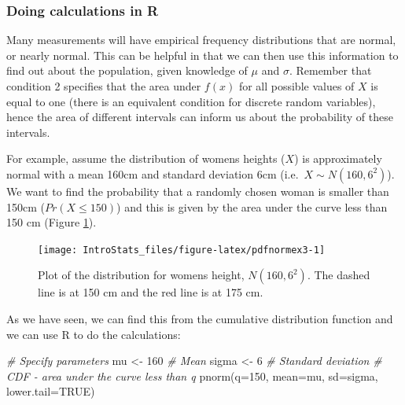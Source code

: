 \documentclass[
  oneside]{krantz}
\newenvironment{Shaded}{\begin{snugshade}}{\end{snugshade}}
\newcommand{\AttributeTok}[1]{\textcolor[rgb]{0.77,0.63,0.00}{#1}}
\newcommand{\CommentTok}[1]{\textcolor[rgb]{0.56,0.35,0.01}{\textit{#1}}}
\newcommand{\ConstantTok}[1]{\textcolor[rgb]{0.00,0.00,0.00}{#1}}
\newcommand{\DecValTok}[1]{\textcolor[rgb]{0.00,0.00,0.81}{#1}}
\newcommand{\FunctionTok}[1]{\textcolor[rgb]{0.00,0.00,0.00}{#1}}
\newcommand{\NormalTok}[1]{#1}
\newcommand{\OtherTok}[1]{\textcolor[rgb]{0.56,0.35,0.01}{#1}}
\begin{document}
\hypertarget{doing-calculations-in-r}{%
\subsubsection{Doing calculations in R}\label{doing-calculations-in-r}}

Many measurements will have empirical frequency distributions that are normal, or nearly normal. This can be helpful in that we can then use this information to find out about the population, given knowledge of \(\mu\) and \(\sigma\). Remember that condition 2 specifies that the area under \(f(x)\) for all possible values of \(X\) is equal to one (there is an equivalent condition for discrete random variables), hence the area of different intervals can inform us about the probability of these intervals.

For example, assume the distribution of womens heights (\(X\)) is approximately normal with a mean 160cm and standard deviation 6cm (i.e.~\(X \sim N(160, 6^2)\)). We want to find the probability that a randomly chosen woman is smaller than 150cm (\(Pr(X \le 150)\)) and this is given by the area under the curve less than 150 cm (Figure \ref{fig:pdfnormex3}).



\begin{figure}

{\centering \texttt{[image: IntroStats\_files/figure-latex/pdfnormex3-1]} 

}

\caption{Plot of the distribution for womens height, \(N(160, 6^2)\). The dashed line is at 150 cm and the red line is at 175 cm.}\label{fig:pdfnormex3}
\end{figure}

As we have seen, we can find this from the cumulative distribution function and we can use R to do the calculations:

\begin{Shaded}
\begin{Highlighting}[]
\CommentTok{\# Specify parameters}
\NormalTok{mu }\OtherTok{\textless{}{-}} \DecValTok{160} \CommentTok{\# Mean}
\NormalTok{sigma }\OtherTok{\textless{}{-}} \DecValTok{6} \CommentTok{\# Standard deviation}
\CommentTok{\# CDF {-} area under the curve less than q}
\FunctionTok{pnorm}\NormalTok{(}\AttributeTok{q=}\DecValTok{150}\NormalTok{, }\AttributeTok{mean=}\NormalTok{mu, }\AttributeTok{sd=}\NormalTok{sigma, }\AttributeTok{lower.tail=}\ConstantTok{TRUE}\NormalTok{)}
\end{Highlighting}
\end{Shaded}
\end{document}
